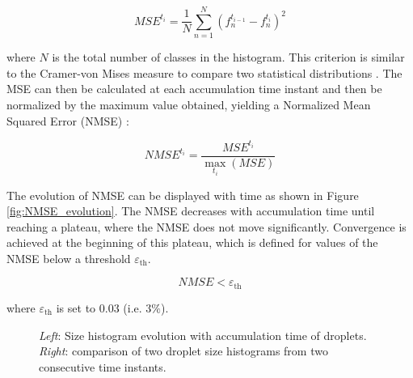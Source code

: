 \begin{equation}
MSE^{t_i} = \frac{1}{N} \sum_{n=1}^N \left( f_n^{t_{i-1}} - f_n^{t_i}  \right)^2
\end{equation}

where $N$ is the total number of classes in the histogram. This criterion is similar to the Cramer-von Mises measure to compare two statistical distributions . The MSE can then be calculated at each accumulation time instant and then be normalized by the maximum value obtained, yielding a Normalized Mean Squared Error (NMSE) :

\begin{equation}
NMSE^{t_i} = \frac{MSE^{t_i}}{\max_{t_i} \left( MSE \right)}
\end{equation}

The evolution of NMSE can be displayed with time as shown in Figure \ref{fig:NMSE_evolution}. The NMSE decreases with accumulation time until reaching a plateau, where the NMSE does not move significantly. Convergence is achieved at the beginning of this plateau, which is defined for values of the NMSE below a threshold $\varepsilon_\mathrm{th}$.

\begin{equation}
NMSE < \varepsilon_\mathrm{th}
\end{equation}

where $\varepsilon_\mathrm{th}$ is set to $0.03$ (i.e. $3 \%$).

%
%
%	
%


\begin{figure}[ht]
     \centering
     \begin{subfigure}[b]{0.45\textwidth}
         \centering
     \end{subfigure}
     \begin{subfigure}[b]{0.45\textwidth}
         \centering
     \end{subfigure}
        \caption{\textsl{Left}: Size histogram evolution with accumulation time of droplets. \textsl{Right}: comparison of two droplet size histograms from two consecutive time instants.}
        \label{fig:spray_convergence_description_accumulation_and_MSE_comparison}
\end{figure}




